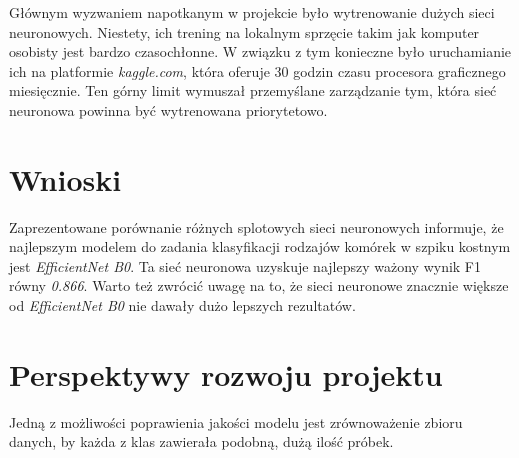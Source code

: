 Głównym wyzwaniem napotkanym w projekcie było wytrenowanie dużych sieci neuronowych. Niestety, ich trening na lokalnym sprzęcie takim jak komputer osobisty jest bardzo czasochłonne.
W związku z tym konieczne było uruchamianie ich na platformie \textit{kaggle.com}, która oferuje 30 godzin czasu procesora graficznego miesięcznie.
Ten górny limit wymuszał przemyślane zarządzanie tym, która sieć neuronowa powinna być wytrenowana priorytetowo.

\section{Wnioski}

Zaprezentowane porównanie różnych splotowych sieci neuronowych informuje, że najlepszym modelem do zadania klasyfikacji rodzajów komórek w szpiku kostnym jest \textit{EfficientNet B0}.
Ta sieć neuronowa uzyskuje najlepszy ważony wynik F1 równy \textit{0.866}.
Warto też zwrócić uwagę na to, że sieci neuronowe znacznie większe od \textit{EfficientNet B0} nie dawały dużo lepszych rezultatów.

\section{Perspektywy rozwoju projektu}

Jedną z możliwości poprawienia jakości modelu jest zrównoważenie zbioru danych, by każda z klas zawierała podobną, dużą ilość próbek.

